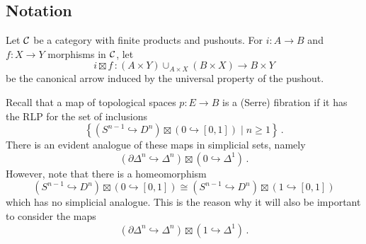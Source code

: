     \subsection{Notation}
        Let $\mathcal{C}$ be a category with finite products and pushouts. For $i \colon A \to B$ and $f \colon X \to Y$ morphisms in $\mathcal{C}$, let
        \begin{equation*}
            i \boxtimes f \,\colon (A \times Y) \cup_{A \times X} (B \times X) \to B \times Y
        \end{equation*}
        be the canonical arrow induced by the universal property of the pushout.
        \smallskip

        Recall that a map of topological spaces $p \colon E \to B$ is a (Serre) fibration if it has the RLP for the set of inclusions
        \begin{equation*}
            \left\{ (S^{n-1} \hookrightarrow D^n) \boxtimes ({0} \hookrightarrow [0, 1]) \mid n \geq 1 \right\} \,.
        \end{equation*}
        There is an evident analogue of these maps in simplicial sets, namely
        \begin{equation*}
            (\partial \Delta^n \hookrightarrow \Delta^n) \boxtimes ({0} \hookrightarrow \Delta^1) \,.
        \end{equation*}
        However, note that there is a homeomorphism
        \begin{equation*}
            (S^{n-1} \hookrightarrow D^n) \boxtimes ({0} \hookrightarrow [0, 1]) \cong (S^{n-1} \hookrightarrow D^n) \boxtimes ({1} \hookrightarrow [0, 1])
        \end{equation*}
        which has no simplicial analogue. This is the reason why it will also be important to consider the maps
        \begin{equation*}
            (\partial \Delta^n \hookrightarrow \Delta^n) \boxtimes ({1} \hookrightarrow \Delta^1) \,.
        \end{equation*}

